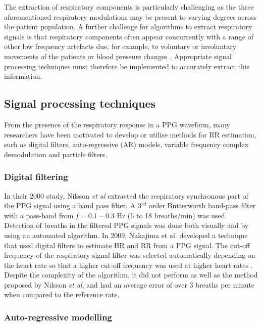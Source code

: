 The extraction of respiratory components is particularly challenging as the three aforementioned respiratory modulations may be present to varying degrees across the patient population. A further challenge for algorithms to extract respiratory signals is that respiratory components often appear concurrently with a range of other low frequency artefacts due, for example, to voluntary or involuntary movements of the patients or blood pressure changes \cite{addison2012developing}. Appropriate signal processing techniques must therefore be implemented to accurately extract this information.

\subsection{Signal processing techniques }

From the presence of the respiratory response in a PPG waveform, many researchers have been motivated to develop or utilise methods for RR estimation, such as digital filters, auto-regressive (AR) models, variable frequency complex demodulation and particle filters.

\subsubsection{Digital filtering}

In their 2000 study, Nilsson \textit{et al} \cite{nilsson2000monitoring} extracted the respiratory synchronous part of the PPG signal using a band pass filter. A 3$^{rd}$ order Butterworth band-pass filter with a pass-band from \textit{f} = 0.1 – 0.3 Hz (6 to 18 breaths/min) was used. Detection of breaths in the filtered PPG signals was done both visually and by using an automated algorithm. In 2009, Nakajima et al. developed a technique that used digital filters to estimate HR and RR from a PPG signal. The cut-off frequency of the respiratory signal filter was selected automatically depending on the heart rate so that a higher cut-off frequency was used at higher heart rates \cite{nakajima1996monitoring}. Despite the complexity of the algorithm, it did not perform as well as the method proposed by Nilsson \textit{et al}, and had an average error of over 3 breaths per minute when compared to the reference rate. 

\subsubsection{Auto-regressive modelling}

